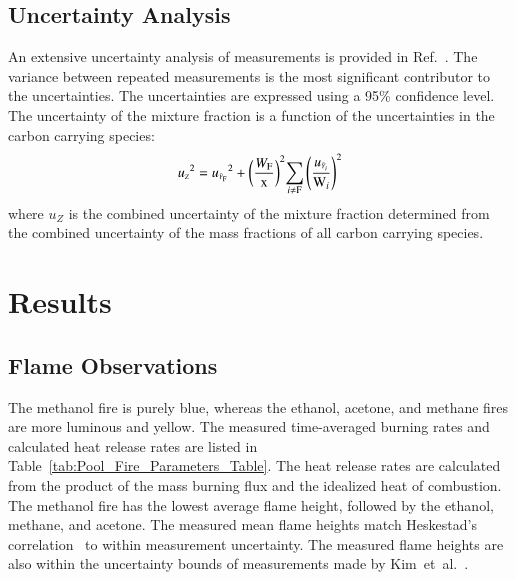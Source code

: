 \documentclass[preprint,review,12pt]{elsarticle}
\begin{document}
\subsection{Uncertainty Analysis}
\label{ssec:Uncertainty Analysis}
An extensive uncertainty analysis of measurements is provided in Ref.~\cite{Falkenstein2019}. The variance between repeated measurements is the most significant contributor to the uncertainties. The uncertainties are expressed using a 95\% confidence level. The uncertainty of the mixture fraction is a function of the uncertainties in the carbon carrying species:
\begin{equation}
\label{eq:mixture_frac_uncertainty}
{u_{\scriptscriptstyle Z}}^2={{u_{\scriptscriptstyle \bar{Y}_{\rm F}}}^2+{\left(\frac{W_{\rm F}}{\rm x}\right)}^2{\sum_{i\ne {\rm F}}{\left(\frac{u_{\scriptscriptstyle \bar{Y}_{i}}}{\textrm{W}_{i}} \right)}^2}}
\end{equation}
where $u_{\scriptscriptstyle Z}$ is the combined uncertainty of the mixture fraction determined from the combined uncertainty of the mass fractions of all carbon carrying species.

\section{Results}
\label{sec:Results}

\subsection{Flame Observations}
\label{ssec:Flame_Observations}
The methanol fire is purely blue, whereas the ethanol, acetone, and methane fires are more luminous and yellow. The measured time-averaged burning rates and calculated heat release rates are listed in Table~\ref{tab:Pool_Fire_Parameters_Table}. The heat release rates are calculated from the product of the mass burning flux and the idealized heat of combustion. The methanol fire has the lowest average flame height, followed by the ethanol, methane, and acetone. The measured mean flame heights match Heskestad’s correlation~\cite{Heskestad1983} to within measurement uncertainty. The measured flame heights are also within the uncertainty bounds of measurements made by Kim~et~al.~\cite{Kim2019}.
\end{document}
